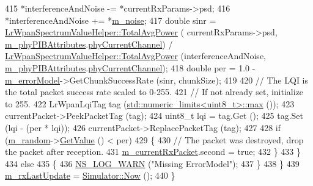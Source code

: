\begin{DoxyCode}
415           *interferenceAndNoise -= *currentRxParams->psd;
416           *interferenceAndNoise += *\hyperlink{classns3_1_1LrWpanPhy_a02560969747aa24f7bded61743f5cc37}{m\_noise};
417           \textcolor{keywordtype}{double} sinr = \hyperlink{classns3_1_1LrWpanSpectrumValueHelper_ab8f05acfb68822f7b94fc637311fbda6}{LrWpanSpectrumValueHelper::TotalAvgPower} (
      currentRxParams->psd, \hyperlink{classns3_1_1LrWpanPhy_a7f263bedbdeed627f7c5f2dab8e960c8}{m\_phyPIBAttributes}.\hyperlink{structns3_1_1LrWpanPhyPibAttributes_a8e620dfd0f5b45fa6c9525d93c498fcb}{phyCurrentChannel}) / 
      \hyperlink{classns3_1_1LrWpanSpectrumValueHelper_ab8f05acfb68822f7b94fc637311fbda6}{LrWpanSpectrumValueHelper::TotalAvgPower} (interferenceAndNoise, 
      \hyperlink{classns3_1_1LrWpanPhy_a7f263bedbdeed627f7c5f2dab8e960c8}{m\_phyPIBAttributes}.\hyperlink{structns3_1_1LrWpanPhyPibAttributes_a8e620dfd0f5b45fa6c9525d93c498fcb}{phyCurrentChannel});
418           \textcolor{keywordtype}{double} per = 1.0 - \hyperlink{classns3_1_1LrWpanPhy_a51ab23fe176708768b6276cdbbd68a06}{m\_errorModel}->GetChunkSuccessRate (sinr, chunkSize);
419 
420           \textcolor{comment}{// The LQI is the total packet success rate scaled to 0-255.}
421           \textcolor{comment}{// If not already set, initialize to 255.}
422           LrWpanLqiTag tag (\hyperlink{80211b_8c_affe776513b24d84b39af8ab0930fef7f}{std::numeric\_limits<uint8\_t>::max} ());
423           currentPacket->PeekPacketTag (tag);
424           uint8\_t lqi = tag.Get ();
425           tag.Set (lqi - (per * lqi));
426           currentPacket->ReplacePacketTag (tag);
427 
428           \textcolor{keywordflow}{if} (\hyperlink{classns3_1_1LrWpanPhy_a307453e07b607f6ec19530c1042f1eba}{m\_random}->\hyperlink{classns3_1_1UniformRandomVariable_a03822d8c86ac51e9aa83bbc73041386b}{GetValue} () < per)
429             \{
430               \textcolor{comment}{// The packet was destroyed, drop the packet after reception.}
431               \hyperlink{classns3_1_1LrWpanPhy_a5e25bc6b183652edc17015d04cca92a3}{m\_currentRxPacket}.second = \textcolor{keyword}{true};
432             \}
433         \}
434       \textcolor{keywordflow}{else}
435         \{
436           \hyperlink{group__logging_gade7208b4009cdf0e25783cd26766f559}{NS\_LOG\_WARN} (\textcolor{stringliteral}{"Missing ErrorModel"});
437         \}
438     \}
439   \hyperlink{classns3_1_1LrWpanPhy_ada4772165b76d85314ecbc3c19a404ab}{m\_rxLastUpdate} = \hyperlink{classns3_1_1Simulator_ac3178fa975b419f7875e7105be122800}{Simulator::Now} ();
440 \}
\end{DoxyCode}


